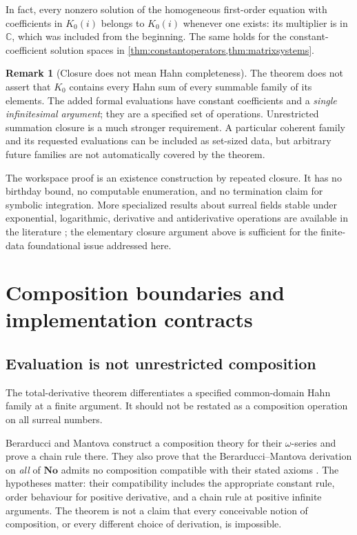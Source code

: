 \documentclass[11pt]{article}
\numberwithin{equation}{section}
\theoremstyle{definition}
\newtheorem{remark}[theorem]{Remark}
\newcommand{\No}{\mathbf{No}}
\newcommand{\C}{\mathbb C}
\begin{document}
In fact, every nonzero solution of the homogeneous first-order equation
with coefficients in $K_0(i)$ belongs to $K_0(i)$ whenever one exists:
its multiplier is in $\C$, which was included from the beginning.
The same holds for the constant-coefficient solution spaces in
\cref{thm:constantoperators,thm:matrixsystems}.

\begin{remark}[Closure does not mean Hahn completeness]
The theorem does not assert that $K_0$ contains every Hahn sum of every
summable family of its elements. The added formal evaluations have
constant coefficients and a \emph{single infinitesimal argument}; they
are a specified set of operations. Unrestricted summation closure is a
much stronger requirement. A particular coherent family and its requested
evaluations can be included as set-sized data, but arbitrary future
families are not automatically covered by the theorem.
\end{remark}

The workspace proof is an existence construction by repeated closure. It
has no birthday bound, no computable enumeration, and no termination
claim for symbolic integration. More specialized results about surreal
fields stable under exponential, logarithmic, derivative and
antiderivative operations are available in the literature
\cite{BournezGuilmant}; the elementary closure argument above is sufficient
for the finite-data foundational issue addressed here.

\section{Composition boundaries and implementation contracts}
\label{sec:contracts}

\subsection{Evaluation is not unrestricted composition}
The total-derivative theorem differentiates a specified common-domain
Hahn family at a finite argument. It should not be restated as a
composition operation on all surreal numbers.

Berarducci and Mantova construct a composition theory for their
$\omega$-series and prove a chain rule there. They also prove that the
Berarducci--Mantova derivation on \emph{all} of $\No$ admits no
composition compatible with their stated axioms
\cite[Theorem 8.4]{BMgerms}. The hypotheses matter: their compatibility
includes the appropriate constant rule, order behaviour for positive
derivative, and a chain rule at positive infinite arguments. The theorem
is not a claim that every conceivable notion of composition, or every
different choice of derivation, is impossible.
\end{document}
